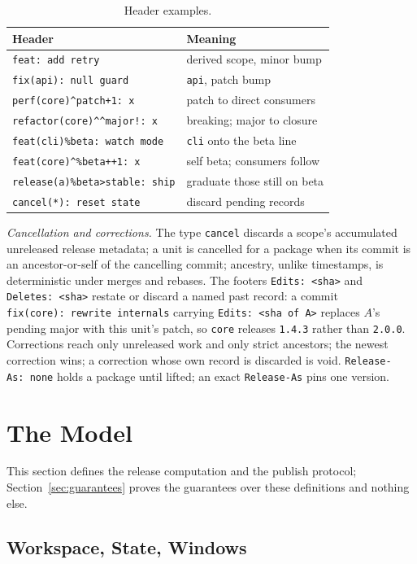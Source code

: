 \documentclass[sigconf,nonacm]{acmart}
\newcommand{\code}[1]{\texttt{#1}}
\begin{document}
\begin{table}[t]
\caption{Header examples.}
\label{tab:headers}
\small
\begin{tabular}{@{}ll@{}}
\toprule
Header & Meaning \\
\midrule
\code{feat: add retry} & derived scope, minor bump \\
\code{fix(api): null guard} & \code{api}, patch bump \\
\code{perf(core)\^{}patch+1: x} & patch to direct consumers \\
\code{refactor(core)\^{}\^{}major!: x} & breaking; major to closure \\
\code{feat(cli)\%beta: watch mode} & \code{cli} onto the beta line \\
\code{feat(core)\^{}\%beta++1: x} & self beta; consumers follow \\
\code{release(a)\%beta>stable: ship} & graduate those still on beta \\
\code{cancel(*): reset state} & discard pending records \\
\bottomrule
\end{tabular}
\end{table}

\emph{Cancellation and corrections.} The type \code{cancel} discards a
scope's accumulated unreleased release metadata; a unit is cancelled for
a package when its commit is an ancestor-or-self of the cancelling
commit; ancestry, unlike timestamps, is deterministic under merges and
rebases. The footers \code{Edits:~<sha>} and \code{Deletes:~<sha>}
restate or discard a named past record: a commit
\code{fix(core):~rewrite internals} carrying \code{Edits:~<sha of A>}
replaces $A$'s pending major with this unit's patch, so \code{core}
releases \code{1.4.3} rather than \code{2.0.0}. Corrections reach only
unreleased work and only strict ancestors; the newest correction wins; a
correction whose own record is discarded is void.
\code{Release-As:~none} holds a package until lifted; an exact
\code{Release-As} pins one version.

\section{The Model}
\label{sec:model}

This section defines the release computation and the publish protocol;
Section~\ref{sec:guarantees} proves the guarantees over these
definitions and nothing else.

\subsection{Workspace, State, Windows}
\end{document}
